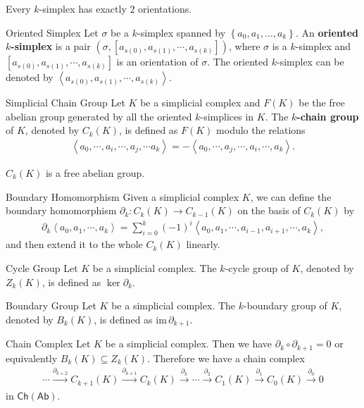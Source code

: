 \documentclass{report}
\begin{document}
Every $k$-simplex has exactly $2$ orientations.
\begin{definition}{Oriented Simplex}{}
	Let $\sigma$ be a $k$-simplex spanned by $\left\{a_0, a_1, \ldots, a_k\right\}$. An \textbf{oriented $k$-simplex} is a pair $\left(\sigma, \left[a_{s(0)},a_{s(1)},\cdots,a_{s(k)}\right]\right)$, where $\sigma$ is a $k$-simplex and $\left[a_{s(0)},a_{s(1)},\cdots,a_{s(k)}\right]$ is an orientation of $\sigma$. The oriented $k$-simplex can be denoted by $\left\langle a_{s(0)},a_{s(1)},\cdots,a_{s(k)}\right\rangle$.
\end{definition}


\begin{definition}{Simplicial Chain Group}{}
	Let $K$ be a simplicial complex and $F(K)$ be the free abelian group generated by all the oriented $k$-simplices in $K$. The $k$\textbf{-chain group} of $K$, denoted by $C_k(K)$, is defined as $F(K)$ modulo the relations
	\begin{align*}
		\left\langle a_{0}, \cdots ,a_{i},\cdots,a_{j},\cdots a_{k}\right\rangle=-\left\langle a_{0},\cdots ,a_{j},\cdots,a_{i},\cdots,a_{k}\right\rangle.
	\end{align*}
\end{definition}

$C_k(K)$ is a free abelian group.
\begin{definition}{Boundary Homomorphism}{}
	Given a simplicial complex $K$, we can define the boundary homomorphism $\partial_k:C_k(K)\rightarrow C_{k-1}(K)$ on the basis of $C_k(K)$ by
	\begin{align*}
		\partial_k\left\langle a_{0},a_{1},\cdots,a_{k}\right\rangle=\sum_{i=0}^k(-1)^{i}\left\langle a_{0},a_{1},\cdots,a_{i-1},a_{i+1},\cdots,a_{k}\right\rangle,
	\end{align*}
	and then extend it to the whole $C_k(K)$ linearly.
\end{definition}


\begin{definition}{Cycle Group}{}
	Let $K$ be a simplicial complex. The $k$-cycle group of $K$, denoted by $Z_k(K)$,  is defined as $\ker\partial_k$.
\end{definition}


\begin{definition}{Boundary Group}{}
	Let $K$ be a simplicial complex. The $k$-boundary group of $K$, denoted by $B_k(K)$, is defined as $\mathrm{im}\,\partial_{k+1}$.
\end{definition}


\begin{proposition}{Chain Complex}{}
	Let $K$ be a simplicial complex. Then we have $\partial_k\circ\partial_{k+1}=0$ or equivalently $B_k(K)\subseteq Z_k(K)$. Therefore we have a chain complex
	\begin{align*}
		\cdots\stackrel{\partial_{k+2}}{\longrightarrow}  C_{k+1}(K)\stackrel{\partial_{k+1}}{\longrightarrow} C_{k}(K)\stackrel{\partial_{k}}{\longrightarrow} \cdots\stackrel{\partial_{2}}{\longrightarrow}  C_1(K)\stackrel{\partial_{1}}{\longrightarrow} C_0(K)\stackrel{\partial_{0}}{\longrightarrow}  0
	\end{align*}
	in $\mathsf{Ch}(\mathsf{Ab})$.
\end{proposition}
\end{document}
